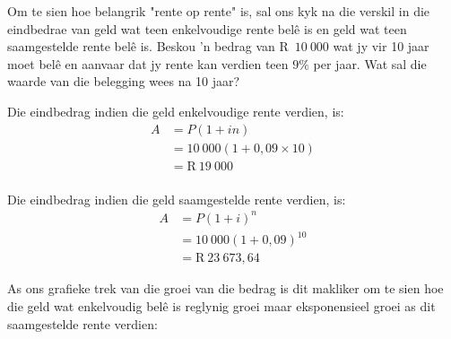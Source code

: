 Om te sien hoe belangrik "rente op rente" is, sal ons kyk na die verskil in die eindbedrae van geld wat teen
enkelvoudige rente belê is en geld wat teen saamgestelde rente belê is. Beskou ’n bedrag van R~$10~000$  wat jy
vir 10 jaar moet belê en aanvaar dat jy rente kan verdien teen $9\%$ per jaar. Wat sal die waarde van die belegging
wees na 10 jaar?\par

Die eindbedrag indien die geld enkelvoudige rente verdien, is:
\begin{align*}
    A &= P(1 + in)\\
      &= 10~000(1 + 0,09 \times 10)\\
      &= \mbox{R}~19~000\\
\end{align*}

Die eindbedrag indien die geld saamgestelde rente verdien, is:
\begin{align*}
    A &= P(1 + i)^n\\
      &= 10~000(1 + 0,09)^{10}\\
      &= \mbox{R}~23~673,64
\end{align*}

As ons grafieke trek van die groei van die bedrag is dit makliker om te sien hoe die geld wat enkelvoudig bel\^e is reglynig groei maar eksponensieel groei as dit saamgestelde rente verdien:

\begin{figure}[H]
    \begin{center}
	\label{FG:fig:SI10}
    \end{center}
\end{figure}


